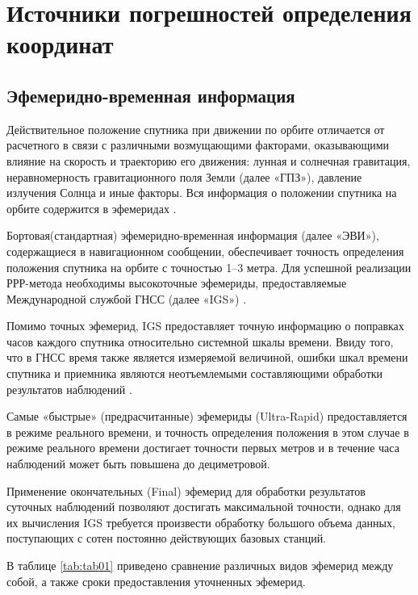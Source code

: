 \section{Источники погрешностей определения координат}\label{sec:ch1/sec3}

\subsection{Эфемеридно-временная информация}\label{subsec:ch1/sec3/sub1}

Действительное положение спутника при движении по орбите отличается от расчетного в связи с различными возмущающими факторами, оказывающими влияние на скорость и траекторию его движения: лунная и солнечная гравитация, неравномерность гравитационного поля Земли (далее «ГПЗ»), давление излучения Солнца и иные факторы. Вся информация о положении спутника на орбите содержится в эфемеридах \cite{src08,src18,src33}.

Бортовая(стандартная) эфемеридно-временная информация (далее «ЭВИ»), содержащиеся в навигационном сообщении, обеспечивает точность определения положения спутника на орбите с точностью 1--3 метра. Для успешной реализации РРР-метода необходимы высокоточные эфемериды, предоставляемые Международной службой ГНСС (далее «IGS») \cite{src32}.

Помимо точных эфемерид, IGS предоставляет точную информацию о поправках часов каждого спутника относительно системной шкалы времени. Ввиду того, что в ГНСС время также является измеряемой величиной, ошибки шкал времени спутника и приемника являются неотъемлемыми составляющими обработки результатов наблюдений \cite{src35}.

Самые «быстрые» (предрасчитанные) эфемериды (Ultra-Rapid) предоставляется в режиме реального времени, и точность определения положения в этом случае в режиме реального времени достигает точности первых метров и в течение часа наблюдений может быть повышена до дециметровой.

Применение окончательных (Final) эфемерид для обработки результатов суточных наблюдений позволяют достигать максимальной точности, однако для их вычисления IGS требуется произвести обработку большого объема данных, поступающих с сотен постоянно действующих базовых станций.

В таблице \cref{tab:tab01} приведено сравнение различных видов эфемерид между собой, а также сроки предоставления уточненных эфемерид.

